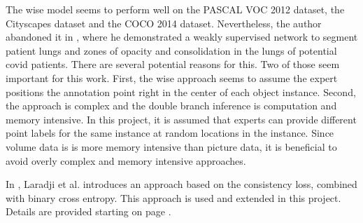 \par{
    The \Gls{wise} model seems to perform well on the PASCAL VOC 2012 dataset, the Cityscapes dataset and the COCO 2014 dataset. 
    Nevertheless, the author abandoned it in \cite{Laradji2020}, where he demonstrated a weakly supervised network to segment patient lungs and zones of opacity and consolidation in the lungs of potential \Gls{covid} patients.
    There are several potential reasons for this. 
    Two of those seem important for this work. 
    First, the \Gls{wise} approach seems to assume the expert positions the annotation point right in the center of each object instance.
    Second, the approach is complex and the double branch inference is computation and memory intensive. 
    In this project, it is assumed that experts can provide different point labels for the same instance at random locations in the instance.
    Since volume data is is more memory intensive than picture data, it is beneficial to avoid overly complex and memory intensive approaches.
}
\par{
    In \cite{Laradji2020}, Laradji et al. introduces an approach based on the consistency loss, combined with binary cross entropy.
    This approach is used and extended in this project.
    Details are provided starting on page \pageref{sec:model_concept}.
}